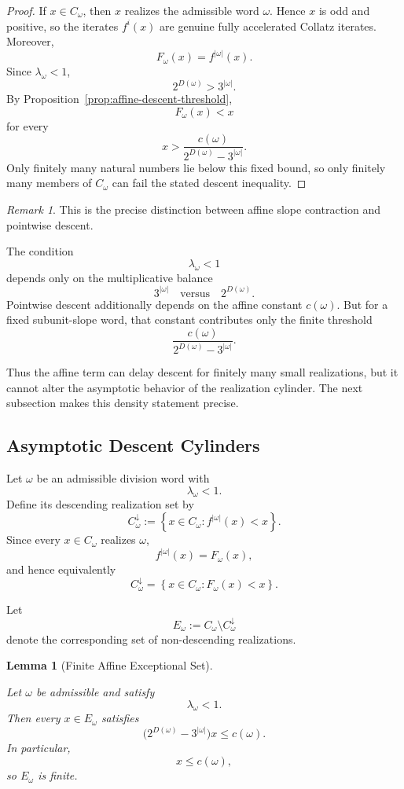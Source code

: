 \documentclass[12pt, oneside]{article}
\numberwithin{equation}{section}
\theoremstyle{definition}
\theoremstyle{plain}
\newtheorem{lemma}[theorem]{Lemma}
\theoremstyle{remark}
\newtheorem*{remark}{Remark}
\begin{document}
\begin{proof}
If \(x\in C_\omega\), then \(x\) realizes the admissible word
\(\omega\). Hence \(x\) is odd and positive, so the iterates
\(f^i(x)\) are genuine fully accelerated Collatz iterates. Moreover,
\[
F_\omega(x)=f^{|\omega|}(x).
\]
Since \(\lambda_\omega<1\),
\[
2^{D(\omega)}>3^{|\omega|}.
\]
By Proposition~\ref{prop:affine-descent-threshold},
\[
F_\omega(x)<x
\]
for every
\[
x>
\frac{c(\omega)}
     {2^{D(\omega)}-3^{|\omega|}}.
\]
Only finitely many natural numbers lie below this fixed bound, so only
finitely many members of \(C_\omega\) can fail the stated descent
inequality.
\end{proof}

\begin{remark}
This is the precise distinction between affine slope contraction and
pointwise descent.

The condition
\[
\lambda_\omega<1
\]
depends only on the multiplicative balance
\[
3^{|\omega|}
\quad\text{versus}\quad
2^{D(\omega)}.
\]
Pointwise descent additionally depends on the affine constant
\(c(\omega)\). But for a fixed subunit-slope word, that constant contributes
only the finite threshold
\[
\frac{c(\omega)}
     {2^{D(\omega)}-3^{|\omega|}}.
\]

Thus the affine term can delay descent for finitely many small realizations,
but it cannot alter the asymptotic behavior of the realization cylinder.
The next subsection makes this density statement precise.
\end{remark}

\subsection{Asymptotic Descent Cylinders}

Let \(\omega\) be an admissible division word with
\[
\lambda_\omega<1.
\]
Define its descending realization set by
\[
C_\omega^\downarrow
:=
\left\{
x\in C_\omega :
f^{|\omega|}(x)<x
\right\}.
\]
Since every \(x\in C_\omega\) realizes \(\omega\),
\[
f^{|\omega|}(x)=F_\omega(x),
\]
and hence equivalently
\[
C_\omega^\downarrow
=
\left\{
x\in C_\omega :
F_\omega(x)<x
\right\}.
\]

Let
\[
E_\omega
:=
C_\omega\setminus C_\omega^\downarrow
\]
denote the corresponding set of non-descending realizations.

\begin{lemma}[Finite Affine Exceptional Set]
\label{lem:finite-affine-exceptional-set}

Let \(\omega\) be admissible and satisfy
\[
\lambda_\omega<1.
\]
Then every \(x\in E_\omega\) satisfies
\[
\bigl(2^{D(\omega)}-3^{|\omega|}\bigr)x
\le
c(\omega).
\]
In particular,
\[
x\le c(\omega),
\]
so \(E_\omega\) is finite.
\end{lemma}
\end{document}
